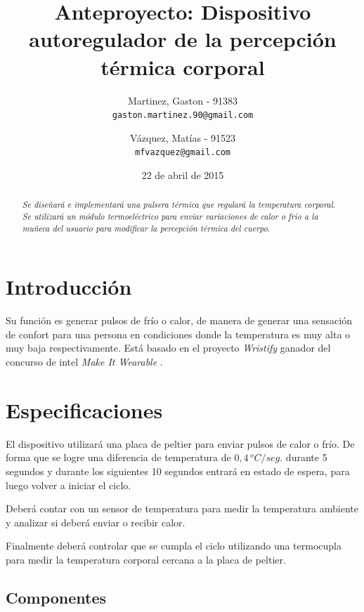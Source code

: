 \documentclass[10pt,spanish,a4paper,openany,notitlepage]{article}
\begin{document}
\title{\textbf{Anteproyecto: Dispositivo autoregulador de la percepción térmica corporal}}
\author{
  Martinez, Gaston - 91383\\
  \texttt{gaston.martinez.90@gmail.com}  
  \and
   Vázquez, Matías - 91523\\
  \texttt{mfvazquez@gmail.com}
}
\date{22 de abril de 2015}
\maketitle

\begin{abstract} %
\emph{Se diseñará e implementará una pulsera térmica que regulará la
temperatura corporal. Se utilizará un módulo termoeléctrico para enviar
variaciones de calor o frío a la muñeca del usuario para modificar
la percepción térmica del cuerpo.}
\end{abstract}

\section{Introducción}

Su función es generar pulsos de frío o calor, de manera de generar una sensación de 
confort para una persona en condiciones donde la temperatura es muy alta 
o muy baja respectivamente.
Está basado en el proyecto \emph{Wristify} \cite{embrlabs} ganador del concurso de intel 
\emph{Make It Wearable} \cite{Make It Wearable}.

\section{Especificaciones}

El dispositivo utilizará una placa de peltier para enviar pulsos de calor
o frío. De forma que se logre una diferencia de temperatura de $0,4\, \unit{^oC/seg.}$
durante 5 segundos y durante los siguientes 10 segundos entrará
en estado de espera, para luego volver a iniciar el ciclo. 

Deberá contar con un sensor de temperatura para medir la temperatura ambiente
y analizar si deberá enviar o recibir calor.

Finalmente deberá controlar que se cumpla el ciclo utilizando una termocupla
para medir la temperatura corporal cercana a la placa de peltier.

\subsection{Componentes}
\end{document}
